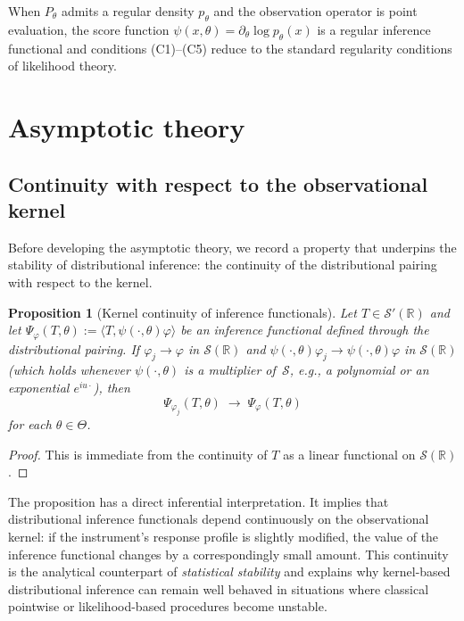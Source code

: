 \documentclass[11pt,a4paper]{article}
\newtheorem{proposition}[theorem]{Proposition}
\newcommand{\R}{\mathbb{R}}
\newcommand{\eg}{{e.g.}, }
\begin{document}
When $P_\theta$ admits a regular density $p_\theta$ and the observation
operator is point evaluation, the score function
$\psi(x, \theta) = \partial_\theta \log p_\theta(x)$ is a regular
inference functional and conditions (C1)--(C5) reduce to the standard
regularity conditions of likelihood theory.


\section{Asymptotic theory}\label{sec:asymptotics}

\subsection{Continuity with respect to the observational kernel}\label{subsec:kernel-continuity}

Before developing the asymptotic theory, we record a property that
underpins the stability of distributional inference: the continuity of the
distributional pairing with respect to the kernel.

\begin{proposition}[Kernel continuity of inference functionals]\label{prop:kernel-cont}
Let $T \in \mathcal S'(\R)$ and let
$\Psi_\varphi(T, \theta) := \langle T, \psi(\cdot, \theta)\varphi \rangle$
be an inference functional defined through the distributional pairing.  If
$\varphi_j \to \varphi$ in $\mathcal S(\R)$ and
$\psi(\cdot, \theta)\varphi_j \to \psi(\cdot, \theta)\varphi$ in
$\mathcal S(\R)$ (which holds whenever $\psi(\cdot, \theta)$ is a
multiplier of~$\mathcal S$, \eg a polynomial or an exponential
$e^{iu\cdot}$), then
\[
\Psi_{\varphi_j}(T, \theta) \;\longrightarrow\; \Psi_\varphi(T, \theta)
\]
for each $\theta \in \Theta$.
\end{proposition}

\begin{proof}
This is immediate from the continuity of $T$ as a linear functional on
$\mathcal S(\R)$.
\end{proof}

The proposition has a direct inferential interpretation.  It implies that
distributional inference functionals depend continuously on the
observational kernel: if the instrument's response profile is slightly
modified, the value of the inference functional changes by a correspondingly
small amount.  This continuity is the analytical counterpart of
\emph{statistical stability} and explains why kernel-based distributional
inference can remain well behaved in situations where classical
pointwise or likelihood-based procedures become unstable.
\end{document}
